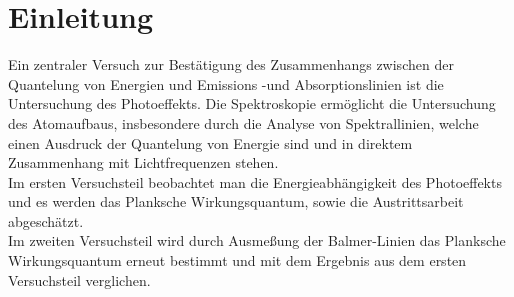 \chapter{Einleitung}
Ein zentraler Versuch zur Bestätigung des Zusammenhangs zwischen der Quantelung von Energien und Emissions -und Absorptionslinien ist die Untersuchung des Photoeffekts. Die Spektroskopie ermöglicht die Untersuchung des Atomaufbaus, insbesondere durch die Analyse von Spektrallinien, welche einen Ausdruck der Quantelung von Energie sind und in direktem Zusammenhang mit Lichtfrequenzen stehen. \\
Im ersten Versuchsteil beobachtet man die Energieabhängigkeit des Photoeffekts und es werden das Planksche Wirkungsquantum, sowie die Austrittsarbeit abgeschätzt. 
\\
Im zweiten Versuchsteil wird durch Ausmeßung der Balmer-Linien das Planksche Wirkungsquantum erneut bestimmt und mit dem Ergebnis aus dem ersten Versuchsteil verglichen.
